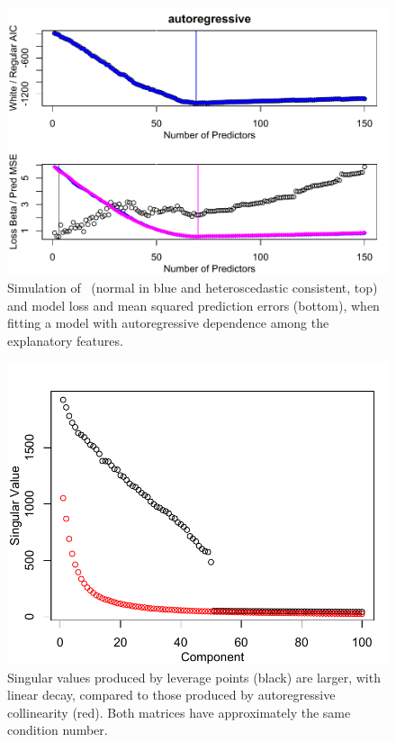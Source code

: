 \documentclass[12pt]{article}
\begin{document}
 \begin{figure}
 \caption{ Simulation of \aic\ (normal in blue and heteroscedastic consistent,
 top) and model loss and mean squared prediction errors (bottom), when fitting a
 model with autoregressive dependence among the explanatory features. }
 \label{fig:example3}
  \centerline{ \includegraphics[width=5in]{figures/leverage/example3.pdf} }
 \end{figure}


 \begin{figure}
 \caption{ Singular values produced by leverage points (black) are larger, with
 linear decay, compared to those produced by autoregressive collinearity
 (red). Both matrices have approximately the same condition number. }
 \label{fig:svd}
  \centerline{ \includegraphics[width=5in]{figures/leverage/svd.pdf} }
 \end{figure}
\end{document}
